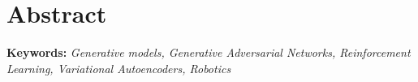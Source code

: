 \pagestyle{fancy}

\providecommand{\keywords}[1]{\textbf{Keywords:} #1}

\chapter*{Abstract}

\vspace{-30 pt}



\keywords{\textit{Generative models, Generative Adversarial Networks, Reinforcement Learning, Variational Autoencoders, Robotics}}

\clearpage{\pagestyle{empty}\cleardoublepage}





